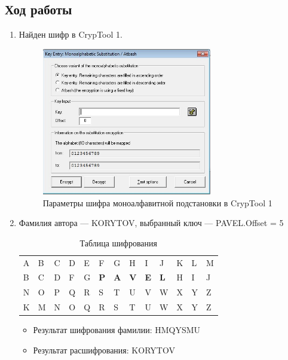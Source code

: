 \documentclass[a4paper, 14pt]{extarticle}
\begin{document}
\subsection{Ход работы}
\begin{enumerate}
    \item Найден шифр в CrypTool 1.
    \begin{figure}[h]
        \centering
        \includegraphics[width=0.7\textwidth]{./img/S001.jpg}
        \caption{Параметры шифра моноалфавитной подстановки в CrypTool 1}
    \end{figure}
    \item Фамилия автора --- KORYTOV, выбранный ключ --- PAVEL.\@ Offset = 5
    \begin{table}[h]
        \centering
        \caption{Таблица шифрования}
        \begin{tabularx}{\textwidth}{@{}XXXXXXXXXXXXX@{}}
        \toprule
        A & B & C & D & E & F & G & H & I & J & K & L & M \\
        B & C & D & F & G & \textbf{P} & \textbf{A} & \textbf{V} & \textbf{E} & \textbf{L} & H & I & J \\ \midrule
        N & O & P & Q & R & S & T & U & V & W & X & Y & Z \\
        K & M & N & O & Q & R & S & T & U & W & X & Y & Z \\ \bottomrule
        \end{tabularx}
    \end{table}
    \begin{itemize}
        \item Результат шифрования фамилии: HMQYSMU
        \item Результат расшифрования: KORYTOV\\
    \end{itemize}

\end{enumerate}
\end{document}
